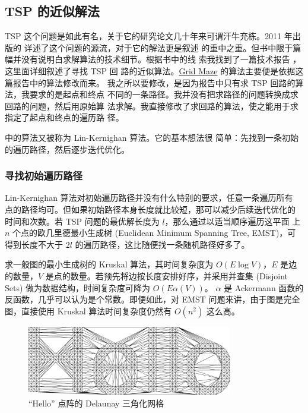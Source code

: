 \documentclass[cs4size,a4paper,adobefonts]{ctexart}
\newcommand{\GridMaze}{\href{http://itunes.apple.com/app/grid-maze/id553265800?mt=8}{Grid Maze}}
\begin{document}
\subsection{TSP 的近似解法}
TSP 这个问题是如此有名，关于它的研究论文几十年来可谓汗牛充栋。2011 年出
版的 \cite{cook2011pursuit} 详述了这个问题的源流，对于它的解法更是叙述
的重中之重。但书中限于篇幅并没有说明白求解算法的技术细节。根据书中的线
索我找到了一篇技术报告 \cite{1999finding}，这里面详细叙述了寻找 TSP 回
路的近似算法。\GridMaze{} 的算法主要便是依据这篇报告中的算法修改而来。
我之所以要修改，是因为报告中只有求 TSP 回路的算法，我要求的是起点和终点
不同的一条路径。我并没有把求路径的问题转换成求回路的问题，然后用原始算
法求解。我直接修改了求回路的算法，使之能用于求指定了起点和终点的遍历路
径。

\cite{1999finding} 中的算法又被称为 Lin-Kernighan 算法。它的基本想法很
简单：先找到一条初始的遍历路径，然后逐步迭代优化。

\subsubsection{寻找初始遍历路径}
Lin-Kernighan 算法对初始遍历路径并没有什么特别的要求，任意一条遍历所有
点的路径均可。但如果初始路径本身长度就比较短，那可以减少后续迭代优化的
时间和次数。若 TSP 问题的最优解长度为 $l$，那么通过以适当顺序遍历这平面
上 $n$ 个点的欧几里德最小生成树 (Euclidean Minimum Spanning Tree,
EMST)，可得到长度不大于 $2l$ 的遍历路径，这比随便找一条随机路径好多了。

求一般图的最小生成树的 Kruskal 算法，其时间复杂度为 $O(E\log V)$，$E$
是边的数量，$V$ 是点的数量。若预先将边按长度安排好序，并采用并查集
(Disjoint Sets) 做为数据结构，时间复杂度可降为 $O(E\alpha(V))$。
$\alpha$ 是 Ackermann 函数的反函数，几乎可以认为是个常数。即便如此，对
EMST 问题来讲，由于图是完全图，直接使用 Kruskal 算法时间复杂度仍然有
$O(n^2)$ 这么高。 

\begin{figure}[htbp]
  \centering
  \includegraphics[width=0.8\textwidth]{helloTri}
  \caption{``Hello'' 点阵的 Delaunay 三角化网格}\label{fig:helloTri}
\end{figure}
\end{document}
